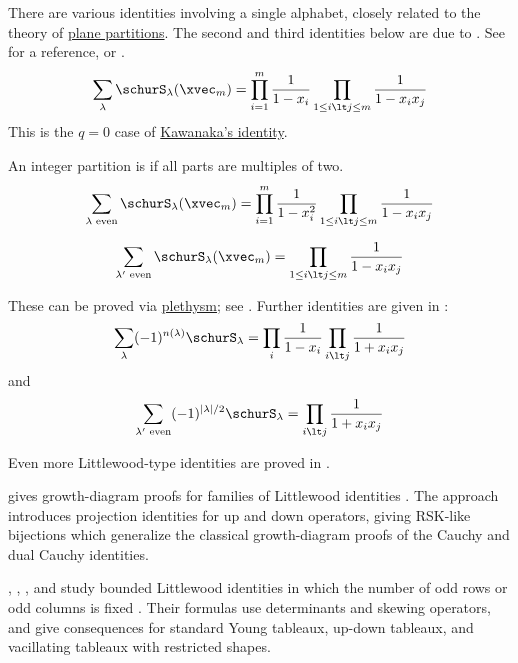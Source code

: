 There are various identities involving a single alphabet,
closely related to the theory of
\hyperref[planePartitions]{plane partitions}.
The second and third identities below are due to .
See \cite[p.~76--77]{Macdonald1995} for a reference, or
\cite[Exercise~4.3.10]{Bressoud1999}.
\begin{equation*}
\sum_{\lambda}
\schurS_\lambda(\xvec_m) = \prod_{i=1}^m \frac{1}{1-x_i} \prod_{1 \leq i \lt j \leq m} \frac{1}{1-x_ix_j}
\end{equation*}
This is the $q=0$ case of \hyperref[schurKawanaka]{Kawanaka's identity}.

An integer partition is \label{evenPartition} if all parts are
multiples of two.
\begin{equation*}
\sum_{\lambda\text{ even}}
\schurS_\lambda(\xvec_m) = \prod_{i=1}^m \frac{1}{1-x^2_i} \prod_{1 \leq i \lt j \leq m} \frac{1}{1-x_ix_j}
\end{equation*}

\begin{equation*}
\sum_{\lambda'\text{ even}}
\schurS_\lambda(\xvec_m) = \prod_{1 \leq i \lt j \leq m} \frac{1}{1-x_ix_j}
\end{equation*}

These can be proved via \hyperref[plethysm]{plethysm}; see \cite{StanleyEC2}.
Further identities are given in \cite[p.~78--79]{Macdonald1995}:
\begin{equation*}
\sum_{\lambda}
(-1)^{n(\lambda)}\schurS_\lambda  = \prod_{i}\frac{1}{1-x_i} \prod_{ i \lt j} \frac{1}{1+x_ix_j}
\end{equation*}
and
\begin{equation*}
\sum_{\lambda'\text{ even}}
(-1)^{|\lambda|/2}\schurS_\lambda  =  \prod_{ i \lt j} \frac{1}{1+x_ix_j}
\end{equation*}

Even more Littlewood-type identities are proved in \cite{Albion2021x}.

 gives growth-diagram proofs for families of
Littlewood identities \cite{SchreierAigner2024x}.  The approach introduces
projection identities for up and down operators, giving RSK-like bijections
which generalize the classical growth-diagram proofs of the Cauchy and dual
Cauchy identities.

, , , and
 study bounded Littlewood identities in which the number
of odd rows or odd columns is fixed \cite{HuhKimKrattenthalerOkada2025x}.
Their formulas use determinants and skewing operators, and give consequences
for standard Young tableaux, up-down tableaux, and vacillating tableaux with
restricted shapes.

